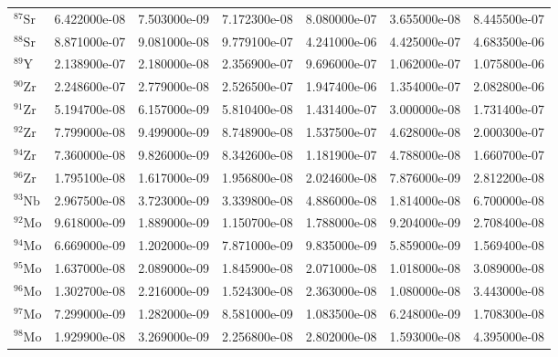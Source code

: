 \begin{tabular}{lrrrrrr}
$^{87}\mathrm{Sr}$  &       6.422000e-08 &      7.503000e-09 &      7.172300e-08 &       8.080000e-07 &      3.655000e-08 &      8.445500e-07 \\
$^{88}\mathrm{Sr}$  &       8.871000e-07 &      9.081000e-08 &      9.779100e-07 &       4.241000e-06 &      4.425000e-07 &      4.683500e-06 \\
$^{89}\mathrm{Y}$   &       2.138900e-07 &      2.180000e-08 &      2.356900e-07 &       9.696000e-07 &      1.062000e-07 &      1.075800e-06 \\
$^{90}\mathrm{Zr}$  &       2.248600e-07 &      2.779000e-08 &      2.526500e-07 &       1.947400e-06 &      1.354000e-07 &      2.082800e-06 \\
$^{91}\mathrm{Zr}$  &       5.194700e-08 &      6.157000e-09 &      5.810400e-08 &       1.431400e-07 &      3.000000e-08 &      1.731400e-07 \\
$^{92}\mathrm{Zr}$  &       7.799000e-08 &      9.499000e-09 &      8.748900e-08 &       1.537500e-07 &      4.628000e-08 &      2.000300e-07 \\
$^{94}\mathrm{Zr}$  &       7.360000e-08 &      9.826000e-09 &      8.342600e-08 &       1.181900e-07 &      4.788000e-08 &      1.660700e-07 \\
$^{96}\mathrm{Zr}$  &       1.795100e-08 &      1.617000e-09 &      1.956800e-08 &       2.024600e-08 &      7.876000e-09 &      2.812200e-08 \\
$^{93}\mathrm{Nb}$  &       2.967500e-08 &      3.723000e-09 &      3.339800e-08 &       4.886000e-08 &      1.814000e-08 &      6.700000e-08 \\
$^{92}\mathrm{Mo}$  &       9.618000e-09 &      1.889000e-09 &      1.150700e-08 &       1.788000e-08 &      9.204000e-09 &      2.708400e-08 \\
$^{94}\mathrm{Mo}$  &       6.669000e-09 &      1.202000e-09 &      7.871000e-09 &       9.835000e-09 &      5.859000e-09 &      1.569400e-08 \\
$^{95}\mathrm{Mo}$  &       1.637000e-08 &      2.089000e-09 &      1.845900e-08 &       2.071000e-08 &      1.018000e-08 &      3.089000e-08 \\
$^{96}\mathrm{Mo}$  &       1.302700e-08 &      2.216000e-09 &      1.524300e-08 &       2.363000e-08 &      1.080000e-08 &      3.443000e-08 \\
$^{97}\mathrm{Mo}$  &       7.299000e-09 &      1.282000e-09 &      8.581000e-09 &       1.083500e-08 &      6.248000e-09 &      1.708300e-08 \\
$^{98}\mathrm{Mo}$  &       1.929900e-08 &      3.269000e-09 &      2.256800e-08 &       2.802000e-08 &      1.593000e-08 &      4.395000e-08 \\

\end{tabular}
